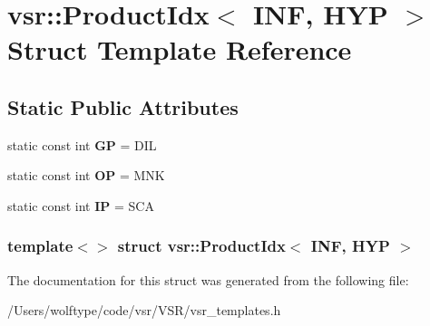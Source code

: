 \hypertarget{structvsr_1_1_product_idx_3_01_i_n_f_00_01_h_y_p_01_4}{\section{vsr\-:\-:Product\-Idx$<$ I\-N\-F, H\-Y\-P $>$ Struct Template Reference}
\label{structvsr_1_1_product_idx_3_01_i_n_f_00_01_h_y_p_01_4}
}
\subsection*{Static Public Attributes}
\begin{DoxyCompactItemize}
\item 
\hypertarget{structvsr_1_1_product_idx_3_01_i_n_f_00_01_h_y_p_01_4_a0ad75a7ad5d3c07ce63dcc2dc380b6bb}{static const int {\bfseries G\-P} = D\-I\-L}\label{structvsr_1_1_product_idx_3_01_i_n_f_00_01_h_y_p_01_4_a0ad75a7ad5d3c07ce63dcc2dc380b6bb}

\item 
\hypertarget{structvsr_1_1_product_idx_3_01_i_n_f_00_01_h_y_p_01_4_aa706359213a36bb193d25e66749494a4}{static const int {\bfseries O\-P} = M\-N\-K}\label{structvsr_1_1_product_idx_3_01_i_n_f_00_01_h_y_p_01_4_aa706359213a36bb193d25e66749494a4}

\item 
\hypertarget{structvsr_1_1_product_idx_3_01_i_n_f_00_01_h_y_p_01_4_a5789993c56bdbf70053fb9e65a2b565a}{static const int {\bfseries I\-P} = S\-C\-A}\label{structvsr_1_1_product_idx_3_01_i_n_f_00_01_h_y_p_01_4_a5789993c56bdbf70053fb9e65a2b565a}

\end{DoxyCompactItemize}
\subsubsection*{template$<$$>$ struct vsr\-::\-Product\-Idx$<$ I\-N\-F, H\-Y\-P $>$}



The documentation for this struct was generated from the following file\-:\begin{DoxyCompactItemize}
\item 
/\-Users/wolftype/code/vsr/\-V\-S\-R/vsr\-\_\-templates.\-h\end{DoxyCompactItemize}
